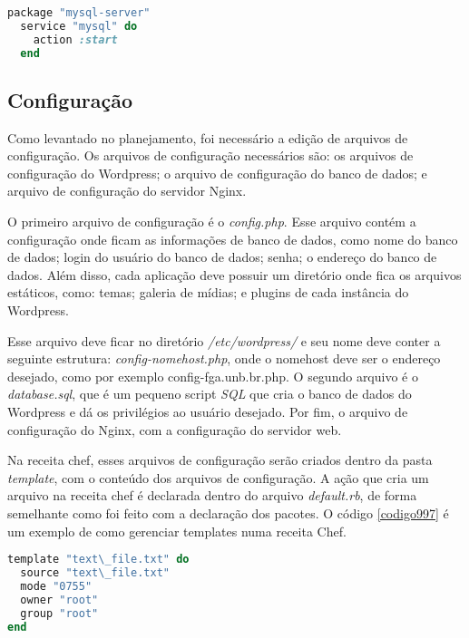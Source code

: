 \begin{lstlisting}[language=Ruby,label=dice_index,caption={Exemplo de criação de serviço do mysql com o chef}, label=codigo998]
  package "mysql-server"
  service "mysql" do
    action :start
  end
\end{lstlisting}

\subsection{Configuração}
\label{wordpress:preparacao}

Como levantado no planejamento, foi necessário a edição de arquivos de configuração. Os
arquivos de configuração necessários são: os arquivos de configuração do Wordpress; 
o arquivo de configuração do banco de dados; e arquivo de configuração do servidor Nginx.

O primeiro arquivo de configuração é o \textit{config.php}. Esse arquivo contém a
configuração onde ficam as informações de banco de dados, como nome do banco de dados;
login do usuário do banco de dados; senha; o endereço do banco de dados. Além disso,
cada aplicação deve possuir um diretório
onde fica os arquivos estáticos, como: temas; galeria de mídias; e plugins 
de cada instância do Wordpress.

Esse arquivo deve ficar no diretório \textit{/etc/wordpress/} e seu nome deve conter
a seguinte estrutura: \textit{config-nomehost.php}, onde o nomehost deve ser o endereço
desejado, como por exemplo config-fga.unb.br.php. O segundo arquivo é o \textit{database.sql}, que é um pequeno script \textit{SQL} que
cria o banco de dados do Wordpress e dá os privilégios ao usuário desejado. Por fim,
o arquivo de configuração do Nginx, com a configuração do servidor web.

Na receita chef, esses arquivos de configuração serão criados dentro da pasta 
\textit{template}, com o conteúdo dos arquivos de configuração. A ação que cria 
um arquivo na receita chef é 
declarada dentro do arquivo \textit{default.rb}, de forma semelhante como foi feito com
a declaração dos pacotes. O código \ref{codigo997} é um exemplo de como 
gerenciar templates numa receita Chef.

\begin{lstlisting}[language=Ruby,label=dice_index,caption={Exemplo de criação de templates com o chef}, label=codigo997]
template "text\_file.txt" do
  source "text\_file.txt"
  mode "0755"
  owner "root"
  group "root"
end
\end{lstlisting}

